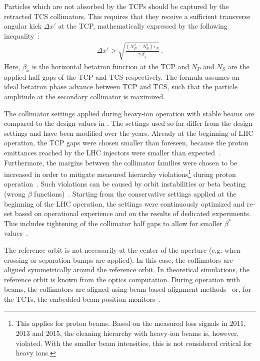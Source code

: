 Particles which are not absorbed by the TCPs should be captured by the retracted TCS collimators. This requires that they receive a sufficient transverse angular kick $\Delta x'$ at the TCP, mathematically expressed by the following inequality~\cite{ICOSIMref02}:
%
\begin{align}
  \Delta x' > \sqrt{\frac{(N_P^2 - N_S^2) \, \epsilon_N }{ \gamma \, \beta_x } } \,.
\end{align}
%
Here, $\beta_x$ is the horizontal betatron function at the TCP and $N_P$ and $N_S$ are the applied half gaps of the TCP and TCS respectively. The formula assumes an ideal betatron phase advance between TCP and TCS, such that the particle amplitude at the secondary collimator is maximized.
%

The collimator settings applied during heavy-ion operation with stable beams are compared to the design values in . The settings used so far differ from the design settings and have been modified over the years. Already at the beginning of LHC operation, the TCP gaps were chosen smaller than foreseen, because the proton emittances reached by the LHC injectors were smaller than expected~\cite{}. Furthermore, the margins between the collimator families were chosen to be increased in order to mitigate measured hierarchy violations\footnote{This applies for proton beams. Based on the measured loss signals in 2011, 2013 and 2015, the cleaning hierarchy with heavy-ion beams is, however, violated. With the smaller beam intensities, this is not considered critical for heavy ions.} during proton operation~\cite{}. Such violations can be caused by orbit instabilities or beta beating (wrong $\beta$ functions)~\cite{CERN-ATS-NOTE-2011-036MD}. Starting from the conservative settings applied at the beginning of the LHC operation, the settings were continuously optimized and re-set based on operational experience and on the results of dedicated experiments. This includes tightening of the collimator half gaps to allow for smaller $\beta^*$ values~\cite{CERN-ATS-2013-045}.

The reference orbit is not necessarily at the center of the aperture (e.g. when crossing or separation bumps are applied). In this case, the collimators are aligned symmetrically around the reference orbit. In theoretical simulations, the reference orbit is known from the optics computation. During operation with beams, the collimators are aligned using beam based alignment methods~\cite{ipac2011:thpz034} or, for the TCTs, the embedded beam position monitors~\cite{accnote:150028}.



